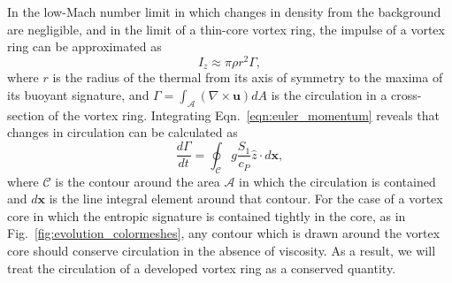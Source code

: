 \documentclass[twocolumn, amsmath, amsfonts, amssymb, trackchanges]{aastex62}
\newcommand{\grad}{\ensuremath{\nabla}}
\begin{document}
In the low-Mach number limit in which changes in density from the background are negligible, and in the limit of a thin-core vortex ring, the impulse of a vortex ring can be approximated as
\begin{equation}
I_z \approx \pi \rho r^2 \Gamma,
\label{eqn:impulse_approx}
\end{equation}
where $r$ is the radius of the thermal from its axis of symmetry to the maxima of its buoyant signature, and $\Gamma = \int_{\mathcal{A}} (\grad\times\bm{u})dA$ is the circulation in a cross-section of the vortex ring.
Integrating Eqn.~\ref{eqn:euler_momentum} reveals that changes in circulation can be calculated as
\begin{equation}
\frac{d\Gamma}{dt} = \oint_{\mathcal{C}} g \frac{S_1}{c_P}\hat{z} \cdot d\bm{x},
\label{eqn:circulation}
\end{equation}
where $\mathcal{C}$ is the contour around the area $\mathcal{A}$ in which the circulation is contained and $d\bm{x}$ is the line integral element around that contour.
For the case of a vortex core in which the entropic signature is contained tightly in the core, as in Fig.~\ref{fig:evolution_colormeshes}, any contour which is drawn around the vortex core should conserve circulation in the absence of viscosity.
As a result, we will treat the circulation of a developed vortex ring as a conserved quantity.
\end{document}
